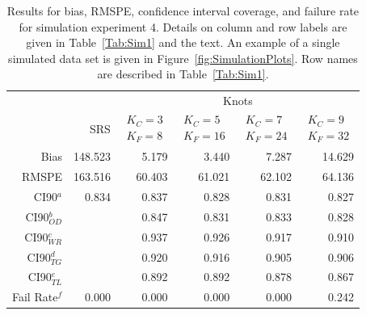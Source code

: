 \documentclass[12pt, titlepage]{article}\usepackage[]{graphicx}\usepackage[]{color}
\begin{document}
\footnotesize
\begin{table}[ht]
\caption{Results for bias, RMSPE, confidence interval coverage, and failure rate for simulation experiment 4. Details on column and row labels are given in Table~\ref{Tab:Sim1} and the text. An example of a single simulated data set is given in Figure~\ref{fig:SimulationPlots}.  Row names are described in Table~\ref{Tab:Sim1}. \label{Tab:Sim4}}
\begin{center}
\begin{tabular}{rrrrrr}
  \hline
  \hline
	&  & \multicolumn{4}{c}{Knots} \\ 
 & SRS & $\begin{array}{c}K_C=3  \\ K_F=8 \end{array}$ & $\begin{array}{c}K_C=5  \\ K_F=16 \end{array}$ & $\begin{array}{c}K_C=7  \\ K_F=24 \end{array}$ & $\begin{array}{c}K_C=9  \\ K_F=32 \end{array}$ \\
  \hline
 Bias & 148.523 & 5.179 & 3.440 & 7.287 & 14.629 \\ 
  RMSPE & 163.516 & 60.403 & 61.021 & 62.102 & 64.136 \\ 
  CI90$^a$ & 0.834 & 0.837 & 0.828 & 0.831 & 0.827 \\ 
  CI90$_{OD}^b$ &  & 0.847 & 0.831 & 0.833 & 0.828 \\ 
  CI90$_{WR}^c$ &  & 0.937 & 0.926 & 0.917 & 0.910 \\ 
  CI90$_{TG}^d$ &  & 0.920 & 0.916 & 0.905 & 0.906 \\ 
  CI90$_{TL}^e$ &  & 0.892 & 0.892 & 0.878 & 0.867 \\ 
  Fail Rate$^f$ & 0.000 & 0.000 & 0.000 & 0.000 & 0.242 \\ 
  

   \hline
\end{tabular}
\end{center}
\end{table}

\end{document}
